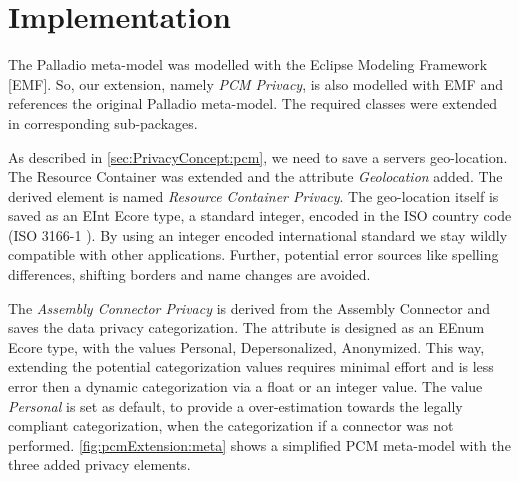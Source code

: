 \section{Implementation}
\label{sec:pcmExtension:impl}

The Palladio meta-model was modelled with the Eclipse Modeling Framework [EMF]. So, our extension, namely \textit{PCM Privacy}, is also modelled with EMF and references the original Palladio meta-model. The required classes were extended in corresponding sub-packages.

As described in \autoref{sec:PrivacyConcept:pcm}, we need to save a servers geo-location. The Resource Container was extended and the attribute \textit{Geolocation} added. The derived element is named \textit{Resource Container Privacy}. The geo-location itself is saved as an EInt Ecore type, a standard integer, encoded in the ISO country code (ISO 3166-1 \cite{Wikipedia.ISO_3166}). By using an integer encoded international standard we stay wildly compatible with other applications. Further, potential error sources like spelling differences, shifting borders and name changes are avoided.

The \textit{Assembly Connector Privacy} is derived from the Assembly Connector and saves the data privacy categorization. The attribute is designed as an EEnum Ecore type, with the values Personal, Depersonalized, Anonymized. This way, extending the potential categorization values requires minimal effort and is less error then a dynamic categorization via a float or an integer value. The value \textit{Personal} is set as default, to provide a over-estimation towards the legally compliant categorization, when the categorization if a connector was not performed. \autoref{fig:pcmExtension:meta} shows a simplified PCM meta-model with the three added privacy elements.





